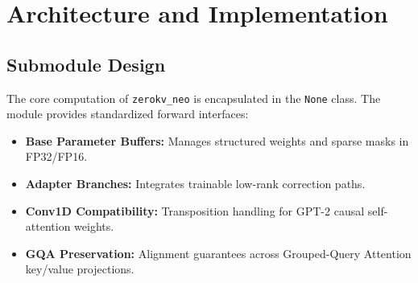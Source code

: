\section{Architecture and Implementation}

\subsection{Submodule Design}
The core computation of \texttt{zerokv_neo} is encapsulated in the \texttt{None} class. The module provides standardized forward interfaces:
\begin{itemize}
\item \textbf{Base Parameter Buffers:} Manages structured weights and sparse masks in FP32/FP16.
\item \textbf{Adapter Branches:} Integrates trainable low-rank correction paths.
\item \textbf{Conv1D Compatibility:} Transposition handling for GPT-2 causal self-attention weights.
\item \textbf{GQA Preservation:} Alignment guarantees across Grouped-Query Attention key/value projections.
\end{itemize}
